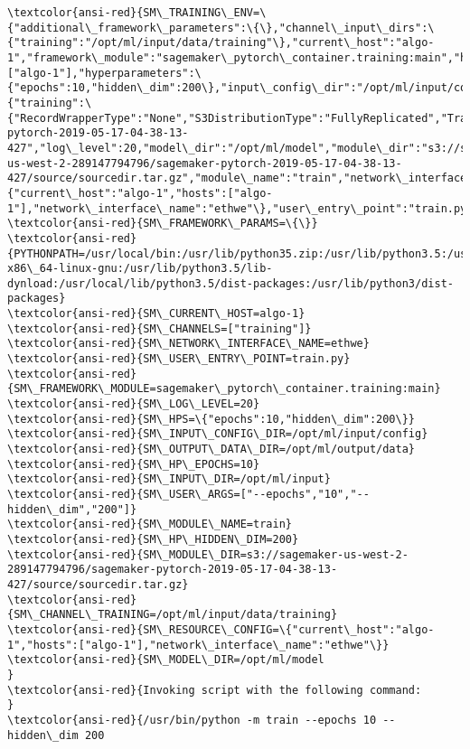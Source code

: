 \documentclass[11pt]{article}
\begin{document}
\begin{Verbatim}[commandchars=\\\{\}]
\textcolor{ansi-red}{SM\_TRAINING\_ENV=\{"additional\_framework\_parameters":\{\},"channel\_input\_dirs":\{"training":"/opt/ml/input/data/training"\},"current\_host":"algo-1","framework\_module":"sagemaker\_pytorch\_container.training:main","hosts":["algo-1"],"hyperparameters":\{"epochs":10,"hidden\_dim":200\},"input\_config\_dir":"/opt/ml/input/config","input\_data\_config":\{"training":\{"RecordWrapperType":"None","S3DistributionType":"FullyReplicated","TrainingInputMode":"File"\}\},"input\_dir":"/opt/ml/input","job\_name":"sagemaker-pytorch-2019-05-17-04-38-13-427","log\_level":20,"model\_dir":"/opt/ml/model","module\_dir":"s3://sagemaker-us-west-2-289147794796/sagemaker-pytorch-2019-05-17-04-38-13-427/source/sourcedir.tar.gz","module\_name":"train","network\_interface\_name":"ethwe","num\_cpus":16,"num\_gpus":0,"output\_data\_dir":"/opt/ml/output/data","output\_dir":"/opt/ml/output","output\_intermediate\_dir":"/opt/ml/output/intermediate","resource\_config":\{"current\_host":"algo-1","hosts":["algo-1"],"network\_interface\_name":"ethwe"\},"user\_entry\_point":"train.py"\}}
\textcolor{ansi-red}{SM\_FRAMEWORK\_PARAMS=\{\}}
\textcolor{ansi-red}{PYTHONPATH=/usr/local/bin:/usr/lib/python35.zip:/usr/lib/python3.5:/usr/lib/python3.5/plat-x86\_64-linux-gnu:/usr/lib/python3.5/lib-dynload:/usr/local/lib/python3.5/dist-packages:/usr/lib/python3/dist-packages}
\textcolor{ansi-red}{SM\_CURRENT\_HOST=algo-1}
\textcolor{ansi-red}{SM\_CHANNELS=["training"]}
\textcolor{ansi-red}{SM\_NETWORK\_INTERFACE\_NAME=ethwe}
\textcolor{ansi-red}{SM\_USER\_ENTRY\_POINT=train.py}
\textcolor{ansi-red}{SM\_FRAMEWORK\_MODULE=sagemaker\_pytorch\_container.training:main}
\textcolor{ansi-red}{SM\_LOG\_LEVEL=20}
\textcolor{ansi-red}{SM\_HPS=\{"epochs":10,"hidden\_dim":200\}}
\textcolor{ansi-red}{SM\_INPUT\_CONFIG\_DIR=/opt/ml/input/config}
\textcolor{ansi-red}{SM\_OUTPUT\_DATA\_DIR=/opt/ml/output/data}
\textcolor{ansi-red}{SM\_HP\_EPOCHS=10}
\textcolor{ansi-red}{SM\_INPUT\_DIR=/opt/ml/input}
\textcolor{ansi-red}{SM\_USER\_ARGS=["--epochs","10","--hidden\_dim","200"]}
\textcolor{ansi-red}{SM\_MODULE\_NAME=train}
\textcolor{ansi-red}{SM\_HP\_HIDDEN\_DIM=200}
\textcolor{ansi-red}{SM\_MODULE\_DIR=s3://sagemaker-us-west-2-289147794796/sagemaker-pytorch-2019-05-17-04-38-13-427/source/sourcedir.tar.gz}
\textcolor{ansi-red}{SM\_CHANNEL\_TRAINING=/opt/ml/input/data/training}
\textcolor{ansi-red}{SM\_RESOURCE\_CONFIG=\{"current\_host":"algo-1","hosts":["algo-1"],"network\_interface\_name":"ethwe"\}}
\textcolor{ansi-red}{SM\_MODEL\_DIR=/opt/ml/model
}
\textcolor{ansi-red}{Invoking script with the following command:
}
\textcolor{ansi-red}{/usr/bin/python -m train --epochs 10 --hidden\_dim 200


\end{Verbatim}
\end{document}
